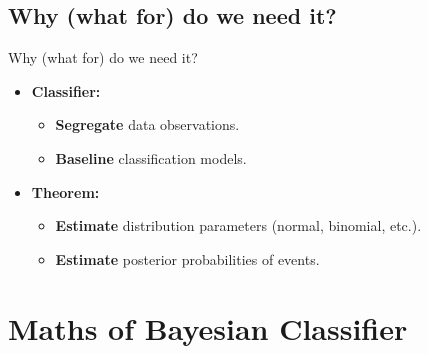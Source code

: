 \documentclass[11pt, aspectratio=169]{beamer}
\newcommand{\emphtext}[1]{\color{black} \textbf{#1}}
\begin{document}
    \subsection{Why (what for) do we need it?}
    \begin{frame}{Why (what for) do we need it?}
    	\large
    	\begin{itemize}
    		\item \textbf{Classifier:}\\[10pt]
    		\begin{itemize}
    			\item \emphtext{Segregate} data observations.\\[10pt]
    			\item \emphtext{Baseline} classification models.\\[10pt]
    		\end{itemize}
    		\item \emphtext{Theorem:}\\[10pt]
    		\begin{itemize}
    			\item \emphtext{Estimate} distribution parameters (normal, binomial, etc.).\\[10pt]
    			\item \emphtext{Estimate} posterior probabilities of events.\\[10pt]
    		\end{itemize}
    	\end{itemize}
    \end{frame}
    
    \section{Maths of Bayesian Classifier}
\end{document}
